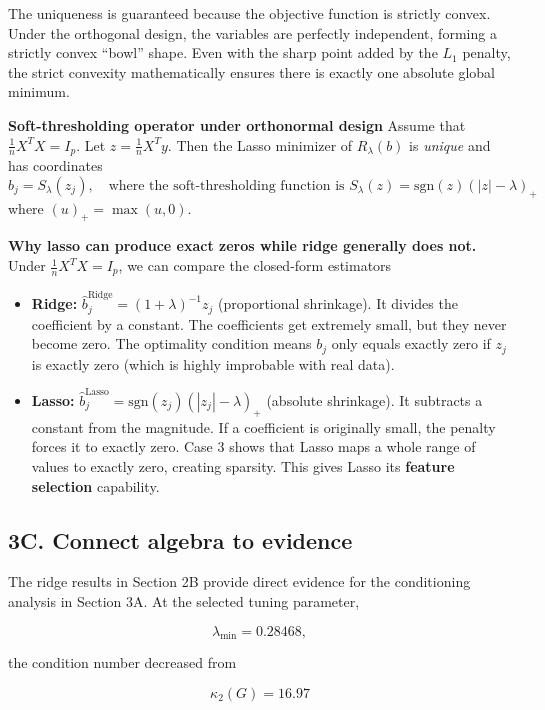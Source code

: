 \documentclass[
  11pt,
]{article}
\providecommand{\tightlist}{%
  \setlength{\itemsep}{0pt}\setlength{\parskip}{0pt}}
\begin{document}
The uniqueness is guaranteed because the objective function is strictly
convex. Under the orthogonal design, the variables are perfectly
independent, forming a strictly convex ``bowl'' shape. Even with the
sharp point added by the \(L_1\) penalty, the strict convexity
mathematically ensures there is exactly one absolute global minimum.

\textbf{Soft-thresholding operator under orthonormal design} Assume that
\(\frac{1}{n} X^T X = I_p\). Let \(z = \frac{1}{n} X^T y\). Then the
Lasso minimizer of \(R_\lambda (b)\) is \emph{unique} and has
coordinates
\[\hat{b}_j = S_\lambda (z_j), \quad \text{where the soft-thresholding function is } S_\lambda (z) = \text{sgn}(z) (|z| - \lambda)_+\]
where \((u)_+ = \max(u, 0)\).

\textbf{Why lasso can produce exact zeros while ridge generally does
not.} Under \(\frac{1}{n} X^T X = I_p\), we can compare the closed-form
estimators

\begin{itemize}
\tightlist
\item
  \textbf{Ridge:} \(\hat{b}_j^{\text{Ridge}} = (1 +  \lambda)^{-1} z_j\)
  (proportional shrinkage). It divides the coefficient by a constant.
  The coefficients get extremely small, but they never become zero. The
  optimality condition means \(b_j\) only equals exactly zero if \(z_j\)
  is exactly zero (which is highly improbable with real data).
\item
  \textbf{Lasso:}
  \(\hat{b}_j^{\text{Lasso}} = \text{sgn}(z_j) (|z_j| - \lambda)_+\)
  (absolute shrinkage). It subtracts a constant from the magnitude. If a
  coefficient is originally small, the penalty forces it to exactly
  zero. Case 3 shows that Lasso maps a whole range of values to exactly
  zero, creating sparsity. This gives Lasso its \textbf{feature
  selection} capability.
\end{itemize}

\subsection{3C. Connect algebra to
evidence}\label{c.-connect-algebra-to-evidence}

The ridge results in Section 2B provide direct evidence for the
conditioning analysis in Section 3A. At the selected tuning parameter,

\[\lambda_{\min}=0.28468,\]

the condition number decreased from

\[\kappa_2(G)=16.97\]
\end{document}
